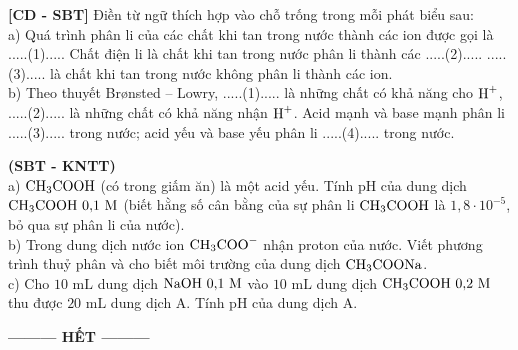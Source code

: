 \documentclass[12pt,a4paper]{article}
\begin{document}
\begin{ex}
\textbf{[CD - SBT]} Điền từ ngữ thích hợp vào chỗ trống trong mỗi phát biểu sau:\\
a) Quá trình phân li của các chất khi tan trong nước thành các ion được gọi là .....(1)..... Chất điện li là chất khi tan trong nước phân li thành các .....(2)..... .....(3)..... là chất khi tan trong nước không phân li thành các ion.\\
b) Theo thuyết Brønsted -- Lowry, .....(1)..... là những chất có khả năng cho $\ce{H+}$, .....(2)..... là những chất có khả năng nhận $\ce{H+}$. Acid mạnh và base mạnh phân li .....(3)..... trong nước; acid yếu và base yếu phân li .....(4)..... trong nước.

\vspace{2.5cm}

\end{ex}

\begin{ex}
\textbf{(SBT - KNTT)}\\
a) $\ce{CH3COOH}$ (có trong giấm ăn) là một acid yếu. Tính pH của dung dịch $\ce{CH3COOH}\ 0{,}1\text{ M}$ (biết hằng số cân bằng của sự phân li $\ce{CH3COOH}$ là $1{,}8 \cdot 10^{-5}$, bỏ qua sự phân li của nước).\\
b) Trong dung dịch nước ion $\ce{CH3COO-}$ nhận proton của nước. Viết phương trình thuỷ phân và cho biết môi trường của dung dịch $\ce{CH3COONa}$.\\
c) Cho $10\text{ mL}$ dung dịch $\ce{NaOH}\ 0{,}1\text{ M}$ vào $10\text{ mL}$ dung dịch $\ce{CH3COOH}\ 0{,}2\text{ M}$ thu được $20\text{ mL}$ dung dịch A. Tính pH của dung dịch A.

\vspace{3.5cm}

\end{ex}

\begin{center}
\textbf{--------- HẾT ---------}
\end{center}
\end{document}

